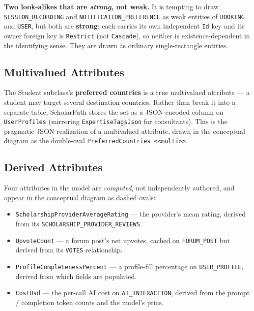 \documentclass[11pt,a4paper]{article}
\begin{document}
\textbf{Two look-alikes that are \emph{strong}, not weak.} It is tempting to
draw \texttt{SESSION\_RECORDING} and \texttt{NOTIFICATION\_PREFERENCE} as weak
entities of \texttt{BOOKING} and \texttt{USER}, but both are \textbf{strong}:
each carries its own independent \texttt{Id} key and its owner foreign key is
\texttt{Restrict} (not \texttt{Cascade}), so neither is existence-dependent in
the identifying sense. They are drawn as ordinary single-rectangle entities.

\subsection{Multivalued Attributes}

The Student subclass's \textbf{preferred countries} is a true multivalued
attribute --- a student may target several destination countries. Rather than
break it into a separate table, ScholarPath stores the set as a JSON-encoded
column on \texttt{UserProfiles} (mirroring \texttt{ExpertiseTagsJson} for
consultants). This is the pragmatic JSON realization of a multivalued attribute,
drawn in the conceptual diagram as the double-oval
\texttt{PreferredCountries}~\texttt{<<multi>>}.

\subsection{Derived Attributes}

Four attributes in the model are \emph{computed}, not independently authored, and
appear in the conceptual diagram as dashed ovals:

\begin{itemize}[leftmargin=1.4em]
  \item \texttt{ScholarshipProviderAverageRating} --- the provider's mean rating,
        derived from its \texttt{SCHOLARSHIP\_PROVIDER\_REVIEWS}.
  \item \texttt{UpvoteCount} --- a forum post's net upvotes, cached on
        \texttt{FORUM\_POST} but derived from its \texttt{VOTES} relationship.
  \item \texttt{ProfileCompletenessPercent} --- a profile-fill percentage on
        \texttt{USER\_PROFILE}, derived from which fields are populated.
  \item \texttt{CostUsd} --- the per-call AI cost on \texttt{AI\_INTERACTION},
        derived from the prompt / completion token counts and the model's price.
\end{itemize}
\end{document}
